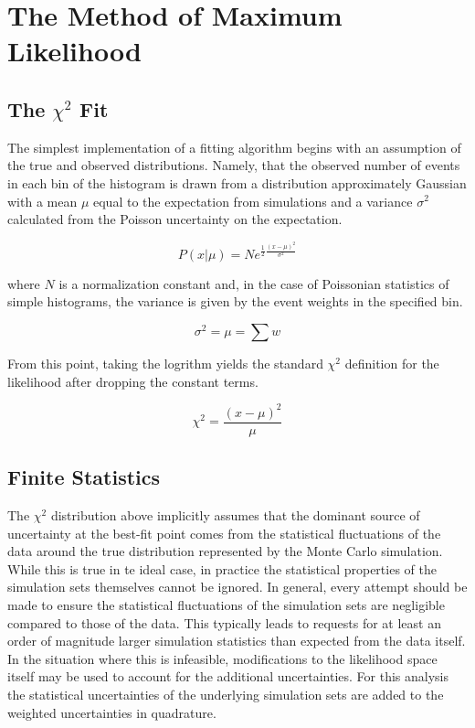 \label{sec:likelihoods}
\section{The Method of Maximum Likelihood}

\label{subsec:chi2}
\subsection{The $\chi^2$ Fit}
The simplest implementation of a fitting algorithm begins with an assumption of the true and observed distributions.
Namely, that the observed number of events in each bin of the histogram is drawn from a distribution approximately Gaussian with a mean $\mu$ equal to the expectation from simulations and a variance $\sigma^2$ calculated from the Poisson uncertainty on the expectation. 

\begin{equation}
	P\left(x|\mu\right) = N e^{\frac{1}{2}\frac{\left(x-\mu\right)^2}{\sigma^2}}
\end{equation}

where $N$ is a normalization constant and, in the case of Poissonian statistics of simple histograms, the variance is given by the event weights in the specified bin.

\begin{equation}
	\sigma^2 = \mu = \sum{w}
\end{equation}

From this point, taking the logrithm yields the standard $\chi^2$ definition for the likelihood after dropping the constant terms.

\begin{equation}
	\chi^2 = \frac{\left(x-\mu\right)^2}{\mu}
\end{equation}	



\label{subsec:finite_stats}
\subsection{Finite Statistics}
The $\chi^2$ distribution above implicitly assumes that the dominant source of uncertainty at the best-fit point comes from the statistical fluctuations of the data around the true distribution represented by the Monte Carlo simulation.
While this is true in te ideal case, in practice the statistical properties of the simulation sets themselves cannot be ignored.
In general, every attempt should be made to ensure the statistical fluctuations of the simulation sets are negligible compared to those of the data.
This typically leads to requests for at least an order of magnitude larger simulation statistics than expected from the data itself.
In the situation where this is infeasible, modifications to the likelihood space itself may be used to account for the additional uncertainties.
For this analysis the statistical uncertainties of the underlying simulation sets are added to the weighted uncertainties in quadrature.

